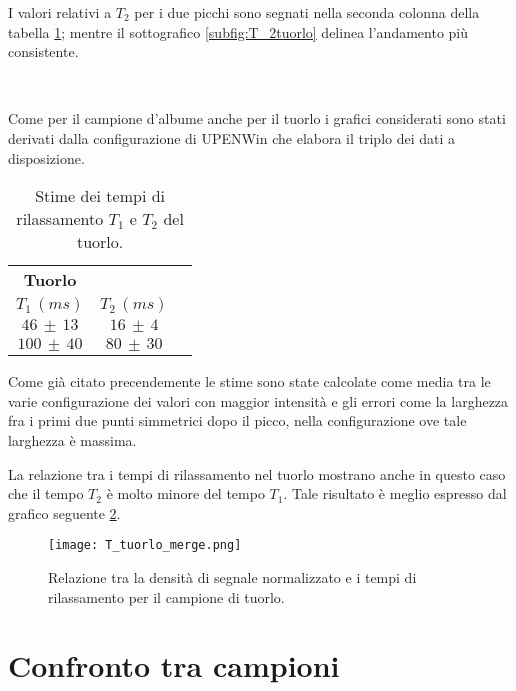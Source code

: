 I valori relativi a $T_2$ per i due picchi sono segnati nella seconda colonna della tabella \ref{tab:Tuorlo}; mentre il sottografico \ref{subfig:T_2tuorlo} delinea l'andamento più consistente.

\begin{figure}[h!]
\centering
{} \quad
{} \\
\caption{}
\label{fig:T_tuorlo}
\end{figure}

Come per il campione d'albume anche per il tuorlo i grafici considerati sono stati derivati dalla configurazione di UPENWin che elabora il triplo dei dati a disposizione.

\begin{table}[h!]
	\centering
	\begin{tabular}{ccc}
	\toprule
					\textbf{Tuorlo}	\\
		$T_1\,(ms)$ 		& 		$T_2\,(ms)$ 		\\	
	\midrule
		$46\,\pm\,13$		&		$16\,\pm\,4$		\\
		$100\,\pm\,40$		&		$80\,\pm\,30$		\\
	\bottomrule
	\end{tabular}
	\caption{Stime dei tempi di rilassamento $T_1$ e $T_2$ del tuorlo.}	
	\label{tab:Tuorlo}
\end{table}

Come già citato precendemente le stime sono state calcolate come media tra le varie configurazione dei valori con maggior intensità e gli errori come la larghezza fra i primi due punti simmetrici dopo il picco, nella configurazione ove tale larghezza è massima.

La relazione tra i tempi di rilassamento nel tuorlo mostrano anche in questo caso che il tempo $T_2$ è molto minore del tempo $T_1$. 
Tale risultato è meglio espresso dal grafico seguente \ref{fig:Tuorlo}.

\begin{figure}[h!]
\centering
\texttt{[image: T\_tuorlo\_merge.png]}
\caption{Relazione tra la densità di segnale normalizzato e i tempi di rilassamento per il campione di tuorlo.}
\label{fig:Tuorlo}
\end{figure}


\section*{Confronto tra campioni}

